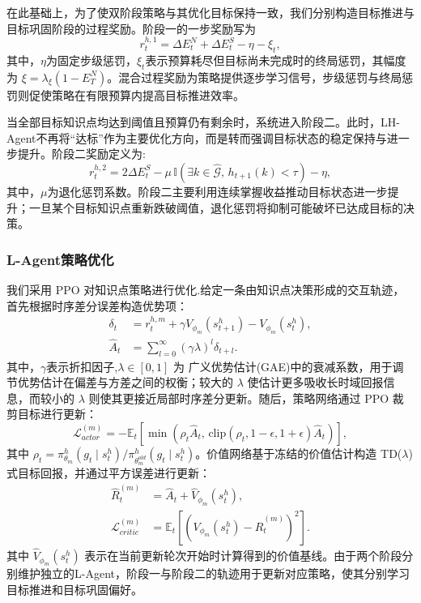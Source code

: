 \documentclass[UTF8,a4paper,zihao=5,twocolumn]{ctexart}
\begin{document}
在此基础上，为了使双阶段策略与其优化目标保持一致，我们分别构造目标推进与目标巩固阶段的过程奖励。阶段一的一步奖励写为
\begin{equation}
r_t^{h,1}
=
\Delta E_t^{N}
+
\Delta E_t^{S}
-
\eta
-
\xi_t,
\end{equation}
其中，$\eta$为固定步级惩罚，$\xi_t$表示预算耗尽但目标尚未完成时的终局惩罚，其幅度为 $\xi=\lambda_{\xi}(1-E_T^{N})$。混合过程奖励为策略提供逐步学习信号，步级惩罚与终局惩罚则促使策略在有限预算内提高目标推进效率。

当全部目标知识点均达到阈值且预算仍有剩余时，系统进入阶段二。此时，LH-Agent不再将“达标”作为主要优化方向，而是转而强调目标状态的稳定保持与进一步提升。阶段二奖励定义为:
\begin{equation}
r_t^{h,2}=2\Delta E_t^{S}-
\mu\,\mathbb{I}\!\left(\exists k\in\hat{\mathcal{G}},\,h_{t+1}(k)<\tau\right)
-
\eta,
\end{equation}
其中，$\mu$为退化惩罚系数。阶段二主要利用连续掌握收益推动目标状态进一步提升；一旦某个目标知识点重新跌破阈值，退化惩罚将抑制可能破坏已达成目标的决策。

\subsubsection{L-Agent策略优化}

我们采用 PPO 对知识点策略进行优化.给定一条由知识点决策形成的交互轨迹，首先根据时序差分误差构造优势项：
\begin{equation}
\begin{aligned}
\delta_t &= r_t^{h,m}+\gamma V_{\phi_m}(s_{t+1}^h)-V_{\phi_m}(s_t^h),\\
\hat{A}_t &= \sum_{l=0}^{\infty}(\gamma\lambda)^l\delta_{t+l}.
\end{aligned}
\end{equation}
其中，$\gamma$表示折扣因子,$\lambda\in[0,1]$ 为 广义优势估计(GAE)中的衰减系数，用于调节优势估计在偏差与方差之间的权衡；较大的 $\lambda$ 使估计更多吸收长时域回报信息，而较小的 $\lambda$ 则使其更接近局部时序差分更新。随后，策略网络通过 PPO 裁剪目标进行更新：
\begin{equation}
\mathcal{L}_{actor}^{(m)}
=
-\mathbb{E}_t
\left[
\min\left(
\rho_t\hat{A}_t,\,
\mathrm{clip}(\rho_t,1-\epsilon,1+\epsilon)\hat{A}_t
\right)
\right],
\end{equation}
其中 $\rho_t=\pi_{\theta_m}^h(g_t\mid s_t^h)/\pi_{\theta_m^{old}}^h(g_t\mid s_t^h)$。价值网络基于冻结的价值估计构造 TD($\lambda$) 式目标回报，并通过平方误差进行更新：
\begin{equation}
\begin{aligned}
\hat{R}_t^{(m)}
&=\hat{A}_t+\hat{V}_{\phi_m}(s_t^h),\\
\mathcal{L}_{critic}^{(m)}
&=\mathbb{E}_t\!\left[
\left(V_{\phi_m}(s_t^h)-\hat{R}_t^{(m)}\right)^2
\right].
\end{aligned}
\end{equation}
其中 $\hat{V}_{\phi_m}(s_t^h)$ 表示在当前更新轮次开始时计算得到的价值基线。由于两个阶段分别维护独立的L-Agent，阶段一与阶段二的轨迹用于更新对应策略，使其分别学习目标推进和目标巩固偏好。
\end{document}

